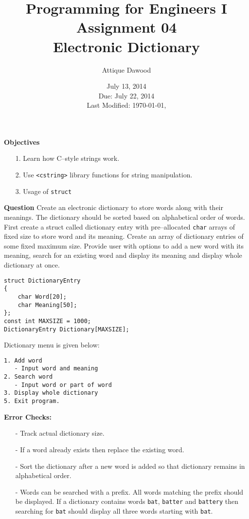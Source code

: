\documentclass[12pt,a4paper]{article}
\title{Programming for Engineers I\\Assignment 04\\Electronic Dictionary}
\author{Attique Dawood}
\date{July 13, 2014\\Due: July 22, 2014\\[0.2cm] Last Modified: \today, \currenttime}
\begin{document}
\maketitle
\noindent\textbf{Objectives}
\begin{itemize}
\item[1.] Learn how C--style strings work.
\item[2.] Use \verb|<cstring>| library functions for string manipulation.
\item[3.] Usage of \verb|struct|
\end{itemize}
\noindent\textbf{Question} Create an electronic dictionary to store words along with their meanings. The dictionary should be sorted based on alphabetical order of words. First create a struct called dictionary entry with pre--allocated \verb|char| arrays of fixed size to store word and its meaning. Create an array of dictionary entries of some fixed maximum size. Provide user with options to add a new word with its meaning, search for an existing word and display its meaning and display whole dictionary at once.
\begin{verbatim}
struct DictionaryEntry
{
    char Word[20];
    char Meaning[50];
};
const int MAXSIZE = 1000;
DictionaryEntry Dictionary[MAXSIZE];
\end{verbatim}
Dictionary menu is given below:
\begin{verbatim}
1. Add word
   - Input word and meaning
2. Search word
   - Input word or part of word
3. Display whole dictionary
5. Exit program.
\end{verbatim}
\noindent\textbf{Error Checks:}
\begin{itemize}
\item[-] Track actual dictionary size.
\item[-] If a word already exists then replace the existing word.
\item[-] Sort the dictionary after a new word is added so that dictionary remains in alphabetical order.
\item[-] Words can be searched with a prefix. All words matching the prefix should be displayed. If a dictionary contains words \verb|bat|, \verb|batter| and \verb|battery| then searching for \verb|bat| should display all three words starting with \verb|bat|.
\end{itemize}
\end{document}
